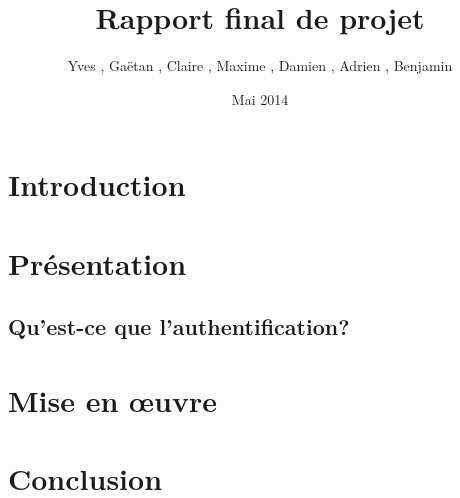 \documentclass{"../../res/univ-projet-rapport"}
\title{Rapport final de projet}
\author{Yves \bsc{Adegoloye}, Gaëtan \bsc{Ferry}, Claire \bsc{Hardouin}, Maxime \bsc{Michotte}, Damien \bsc{Picard}, Adrien \bsc{Smondack}, Benjamin \bsc{Zigh}}
\date{Mai 2014}
\begin{document}
\maketitle
\tableofcontents
\newpage

\chapter{Introduction}


\chapter{Présentation}

\section{Qu'est-ce que l'authentification?}




\chapter{Mise en œuvre}



\chapter{Conclusion}
\cite{HOTPrfc}

{}

\end{document}
